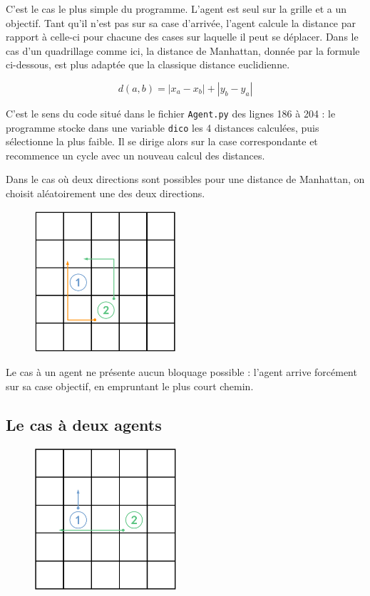 \documentclass[a4paper, 12pt, french]{article}
\begin{document}
C’est le cas le plus simple du programme. L'agent est seul sur la grille et a un objectif. Tant qu'il n'est pas sur sa case d'arrivée, l'agent calcule la distance par rapport à celle-ci pour chacune des cases sur laquelle il peut se déplacer. Dans le cas d'un quadrillage comme ici, la distance de Manhattan, donnée par la formule ci-dessous, est plus adaptée que la classique distance euclidienne.

\[
d(a, b) = |x_a - x_b| + |y_b - y_a|
\]

C'est le sens du code situé dans le fichier \texttt{Agent.py} des lignes 186 à 204 : le programme stocke dans une variable \texttt{dico} les 4 distances calculées, puis sélectionne la plus faible. Il se dirige alors sur la case correspondante et recommence un cycle avec un nouveau calcul des distances.

Dans le cas où deux directions sont possibles pour une distance de Manhattan, on choisit aléatoirement une des deux directions.

\begin{figure}[h]
	\centering
	\includegraphics[width=200px]{images/manhattan_equal.png}
\end{figure}

Le cas à un agent ne présente aucun bloquage possible : l'agent arrive forcément sur sa case objectif, en empruntant le plus court chemin.

\subsection{Le cas à deux agents}

\begin{figure}[h]
	\centering
	\includegraphics[width=200px]{images/2_agents.png}
\end{figure}
\end{document}
